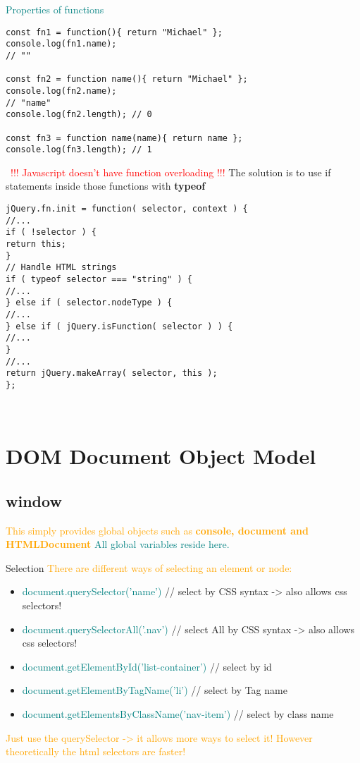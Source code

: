 \documentclass[main.tex,fontsize=6pt,paper=a4,paper=landscape,DIV=calc,]{scrartcl}
\begin{document}
\begin{multicols*}{4}
  \textcolor{teal}{Properties of functions}
\begin{lstlisting}
const fn1 = function(){ return "Michael" };
console.log(fn1.name);
// ""

const fn2 = function name(){ return "Michael" };
console.log(fn2.name);
// "name"
console.log(fn2.length); // 0

const fn3 = function name(name){ return name };
console.log(fn3.length); // 1
\end{lstlisting}
\, \newline
 \textcolor{red}{!!! Javascript doesn't have function overloading !!!}\newline
 The solution is to use if statements inside those functions with \textbf{typeof}
\begin{lstlisting}
jQuery.fn.init = function( selector, context ) {
//...
if ( !selector ) {
return this;
}
// Handle HTML strings
if ( typeof selector === "string" ) {
//...
} else if ( selector.nodeType ) {
//...
} else if ( jQuery.isFunction( selector ) ) {
//...
}
//...
return jQuery.makeArray( selector, this );
};
\end{lstlisting}
\, \newline





\section{DOM Document Object Model}

\subsection{window}  
\textcolor{orange}{This simply provides global objects such as \textbf{console, document and HTMLDocument}}\newline
\textcolor{teal}{All global variables reside here.}

Selection 
\textcolor{orange}{There are different ways of selecting an element or node:}
\begin{itemize}
  \item \textcolor{teal}{document.querySelector('name')} // select by CSS syntax -> also allows css selectors!
  \item \textcolor{teal}{document.querySelectorAll('.nav')} // select All by CSS syntax -> also allows css selectors!
  \item \textcolor{teal}{document.getElementById('list-container')} // select by id
  \item \textcolor{teal}{document.getElementByTagName('li')} // select by Tag name
  \item \textcolor{teal}{document.getElementsByClassName('nav-item')} // select by class name
\end{itemize}
\textcolor{orange}{Just use the querySelector -> it allows more ways to select it! \newline
However theoretically the html selectors are faster!}


\end{multicols*}
\end{document}
